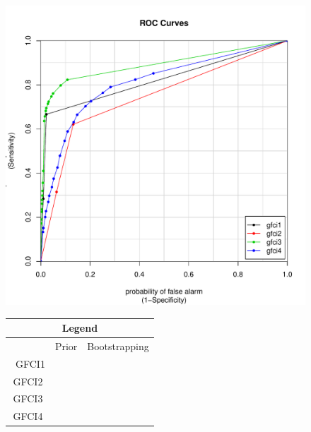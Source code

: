 \documentclass[a4paper,pdf]{article}
\newcommand{\cmark}{\color{green}{\ding{51}}}%
\newcommand{\xmark}{\color{red}{\ding{55}}}
\begin{document}
\begin{figure}[!ht]
    \centering
        \begin{minipage}{0.6\textwidth}
            \centering
            \includegraphics[width=\textwidth]{combinedSimCurvesgfcisim}%
        \end{minipage}\hfill
        \begin{minipage}{0.4\textwidth}
            \centering
            \renewcommand{\arraystretch}{1}
            \setlength{\tabcolsep}{5pt}
            \begin{tabular}{|c|c|c|}
                \multicolumn{3}{c}{\large{\textbf{Legend}}}\\
                \hline
                       & Prior & Bootstrapping\\\
                 GFCI1 & \cmark & \xmark\\
                 GFCI2 & \xmark & \xmark\\
                 GFCI3 & \cmark & \cmark \\
                 GFCI4 & \xmark & \cmark\\
                 \hline
            \end{tabular}
        \end{minipage}
        

\end{figure}
\end{document}
